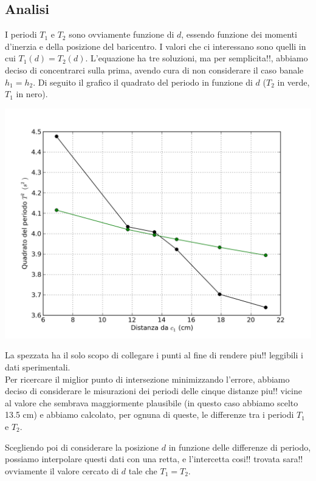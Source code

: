 \subsection{Analisi}
I periodi $T_1$ e $T_2$ sono ovviamente funzione di $d$, essendo funzione dei momenti d'inerzia e della posizione del baricentro. I valori che ci interessano sono quelli in cui $T_1(d) = T_2(d)$.
L'equazione ha tre soluzioni, ma per semplicita!!, abbiamo deciso di concentrarci sulla prima, avendo cura di non considerare il caso banale $h_1=h_2$. Di seguito il grafico il quadrato del periodo in funzione di $d$ ($T_2$ in verde, $T_1$ in nero).

\begin{center}
\includegraphics[scale=0.60]{../grafici/kater/kater-punti-raw.png}
\end{center}

La spezzata ha il solo scopo di collegare i punti al fine di rendere piu!! leggibili i dati sperimentali.\\

Per ricercare il miglior punto di intersezione minimizzando l'errore, abbiamo deciso di considerare le misurazioni dei periodi delle cinque distanze piu!! vicine al valore che sembrava maggiormente plausibile (in questo caso abbiamo scelto 13.5 cm) e abbiamo calcolato, per ognuna di queste, le differenze tra i periodi $T_1$ e $T_2$.

Scegliendo poi di considerare la posizione $d$ in funzione delle differenze di periodo, possiamo interpolare questi dati con una retta, e l'intercetta cosi!! trovata sara!! ovviamente il valore cercato di $d$ tale che $T_1 = T_2$.

